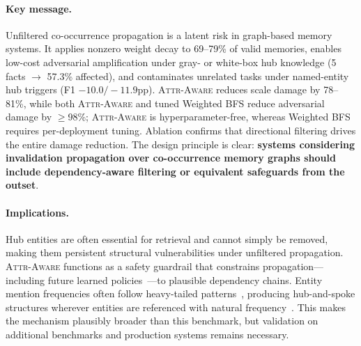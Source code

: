 \documentclass{article}
\newcommand{\attraware}{\textsc{Attr-Aware}}
\begin{document}
\paragraph{Key message.}
Unfiltered co-occurrence propagation is a latent risk in graph-based memory systems.
It applies nonzero weight decay to 69--79\% of valid memories, enables low-cost adversarial amplification under gray- or white-box hub knowledge (5 facts $\rightarrow$ 57.3\% affected), and contaminates unrelated tasks under named-entity hub triggers (F1 $-10.0/-11.9$pp).
\attraware{} reduces scale damage by 78--81\%, while both \attraware{} and tuned Weighted BFS reduce adversarial damage by $\geq$98\%; \attraware{} is hyperparameter-free, whereas Weighted BFS requires per-deployment tuning.
Ablation confirms that directional filtering drives the entire damage reduction.
The design principle is clear: \textbf{systems considering invalidation propagation over co-occurrence memory graphs should include dependency-aware filtering or equivalent safeguards from the outset}.

\paragraph{Implications.}
Hub entities are often essential for retrieval and cannot simply be removed, making them persistent structural vulnerabilities under unfiltered propagation.
\attraware{} functions as a safety guardrail that constrains propagation---including future learned policies~\citep{mars_2025}---to plausible dependency chains.
Entity mention frequencies often follow heavy-tailed patterns~\citep{zipf_1949}, producing hub-and-spoke structures wherever entities are referenced with natural frequency~\citep{steyvers_semantic_2005, barabasi_scalefree_1999}.
This makes the mechanism plausibly broader than this benchmark, but validation on additional benchmarks and production systems remains necessary.
\end{document}
